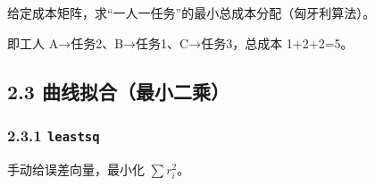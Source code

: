给定成本矩阵，求``一人一任务''的最小总成本分配（匈牙利算法）。

\begin{Shaded}
\begin{Highlighting}[]
\OperatorTok{=}\NormalTok{ [[}\NormalTok{, }\NormalTok{, }\NormalTok{], [}\NormalTok{, }\NormalTok{, }\NormalTok{], [}\NormalTok{, }\NormalTok{, }\NormalTok{]]}
\OperatorTok{=}
\NormalTok{(}
\NormalTok{(}\NormalTok{())}
\end{Highlighting}
\end{Shaded}

\begin{Shaded}
\begin{Highlighting}[]
\end{Highlighting}
\end{Shaded}

即工人 A→任务2、B→任务1、C→任务3，总成本 1+2+2=5。

\subsection{2.3
曲线拟合（最小二乘）}\label{ux66f2ux7ebfux62dfux5408ux6700ux5c0fux4e8cux4e58}

\subsubsection{\texorpdfstring{2.3.1
\texttt{leastsq}}{2.3.1 leastsq}}\label{leastsq}

手动给误差向量，最小化 \(\sum r_i^2\)。

